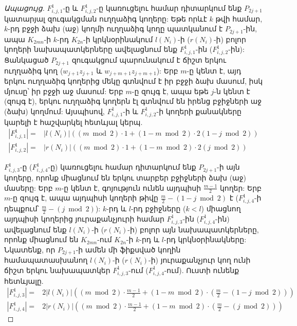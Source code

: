 \begin{hide}
\begin{proof}[Ապացույց]
$F^1_{i,j,1}$-ը և $F^1_{i,j,2}$-ը կառուցելու համար դիտարկում ենք $P_{2j+1}$ կատարյալ զուգակցման ուղղաձիգ կողերը: Եթե որևէ $k$ թվի համար, $k$-րդ բջջի ձախ (աջ) կողմի ուղղաձիգ կողը պատկանում է $P_{2j+1}$-ին, ապա $K_{2mn}$-ի $k$-րդ $K_{2n}$-ի կրկնօրինակում $l(N_i)$-ի ($r(N_i)$-ի) բոլոր կողերի նախապատկերները ավելացնում ենք $F^1_{i,j,1}$-ին ($F^1_{i,j,2}$-ին): Ցանկացած $P_{2j+1}$ զուգակցում պարունակում է ճիշտ երկու ուղղաձիգ կող ($w_{j+1}z_{j+1}$ և $w_{j+m+1}z_{j+m+1}$): Երբ $m$-ը կենտ է, այդ երկու ուղղաձիգ կողերից մեկը գտնվում է իր բջջի ձախ մասում, իսկ մյուսը՝ իր բջջի աջ մասում: Երբ $m$-ը զույգ է, ապա եթե $j$-ն կենտ է (զույգ է), երկու ուղղաձիգ կողերն էլ գտնվում են իրենց բջիջների աջ (ձախ) կողմում: Այսպիսով, $F^1_{i,j,1}$-ի և $F^1_{i,j,2}$-ի կողերի քանակները կարելի է հաշվարկել հետևյալ կերպ.
\begin{align*}
|F^1_{i,j,1}| = &|l(N_i)|\left( (m \bmod 2)\cdot 1 + (1 - m \bmod 2)\cdot 2(1 - j \bmod 2) \right) \\
|F^1_{i,j,2}| = &|r(N_i)|\left( (m \bmod 2)\cdot 1 + (1 - m \bmod 2)\cdot 2(j \bmod 2) \right) 
\end{align*}

$F^1_{i,j,3}$-ը ($F^1_{i,j,4}$-ը) կառուցելու համար դիտարկում ենք $P_{2j+1}$-ի այն կողերը, որոնք միացնում են երկու տարբեր բջիջների ձախ (աջ) մասերը: Երբ $m$-ը կենտ է, գոյություն ունեն այդպիսի $\frac{m-1}{2}$ կողեր: Երբ $m$-ը զույգ է, ապա այդպիսի կողերի թիվը $\frac{m}{2} - (1 - j \bmod 2)$ է ($F^1_{i,j,4}$-ի դեպքում՝ $\frac{m}{2} - (j \bmod 2)$): $k$-րդ և $l$-րդ բջիջները ($k<l$) միացնող այդպիսի կողերից յուրաքանչյուրի համար $F^1_{i,j,3}$-ին ($F^1_{i,j,4}$-ին) ավելացնում ենք $l(N_i)$-ի ($r(N_i)$-ի) բոլոր այն նախապատկերները, որոնք միացնում են $K_{2mn}$-ում $K_{2n}$-ի $k$-րդ և $l$-րդ կրկնօրինակները: Նկատենք, որ $P_{2j+1}$-ի ամեն մի ֆիքսված կողին համապատասխանող $l(N_i)$-ի ($r(N_i)$-ի) յուրաքանչյուր կող ունի ճիշտ երկու նախապատկեր $F^1_{i,j,3}$-ում ($F^1_{i,j,4}$-ում). Ուստի ունենք հետևյալը.
\begin{align*}
|F^1_{i,j,3}| = &2|l(N_i)|\left( (m \bmod 2)\cdot \frac{m-1}{2} + (1 - m \bmod 2)\cdot \left(\frac{m}{2} - (1 - j \bmod 2)\right) \right) \\
|F^1_{i,j,4}| = &2|r(N_i)|\left( (m \bmod 2)\cdot \frac{m-1}{2} + (1 - m \bmod 2)\cdot \left(\frac{m}{2} - (j \bmod 2)\right) \right)
\end{align*}


\end{proof}
\end{hide}
